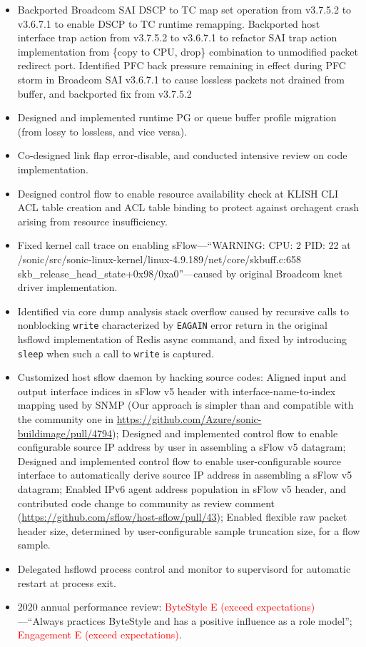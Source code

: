 \documentclass[letterpaper,11pt]{article}
\newcommand{\resitem}[1]{\item #1 \vspace{-2pt}}
\begin{document}
\begin{CJK}{UTF8}{gbsn}
\begin{itemize}
\begin{itemize}
  \resitem{Backported Broadcom SAI DSCP to TC map set operation from v3.7.5.2 to v3.6.7.1 to enable DSCP to TC runtime remapping.
  Backported host interface trap action from v3.7.5.2 to v3.6.7.1 to refactor SAI trap action implementation from
  \{copy to CPU, drop\} combination to unmodified packet redirect port.
  Identified PFC back pressure remaining in effect during PFC storm in Broadcom SAI v3.6.7.1 to cause lossless packets not drained from buffer,
  and backported fix from v3.7.5.2}
  \resitem{Designed and implemented runtime PG or queue buffer profile migration (from lossy to lossless, and vice versa).}
  \resitem{Co-designed link flap error-disable, and conducted intensive review on code implementation.}
  \resitem{Designed control flow to enable resource availability check at KLISH CLI ACL table creation and ACL table binding
  to protect against orchagent crash arising from resource insufficiency.}
  \resitem{
  Fixed kernel call trace on enabling sFlow---``WARNING: CPU: 2 PID: 22 at /sonic/src/sonic-linux-kernel/linux-4.9.189/net/core/skbuff.c:658 skb\_release\_head\_state+0x98/0xa0''---caused by original Broadcom knet driver implementation.}
  \resitem{
  Identified via core dump analysis stack overflow caused by recursive calls to nonblocking {\tt write} characterized by {\tt EAGAIN} error return
  in the original hsflowd implementation of Redis async command, and fixed by introducing {\tt sleep} when such a call to {\tt write} is captured.
  }
  \resitem{Customized host sflow daemon by hacking source codes:
  Aligned input and output interface indices in sFlow v5 header with interface-name-to-index mapping used by SNMP
  (Our approach is simpler than and compatible with the community one in \url{https://github.com/Azure/sonic-buildimage/pull/4794});
  Designed and implemented control flow to enable configurable source IP address by user in assembling a sFlow v5 datagram;
  Designed and implemented control flow to enable user-configurable source interface to automatically derive source IP address
  in assembling a sFlow v5 datagram;
  Enabled IPv6 agent address population in sFlow v5 header, and contributed code change to community as review comment
  (\url{https://github.com/sflow/host-sflow/pull/43});
  Enabled flexible raw packet header size, determined by user-configurable sample truncation size, for a flow sample.}
  \resitem{Delegated hsflowd process control and monitor to supervisord for automatic restart at process exit.}
  \resitem{2020 annual performance review: \textcolor{Red}{ByteStyle E (exceed expectations)}---``Always practices ByteStyle
  and has a positive influence as a role model'';
  \textcolor{Red}{Engagement E (exceed expectations)}.}


\end{itemize}
\end{itemize}
\end{CJK}
\end{document}
